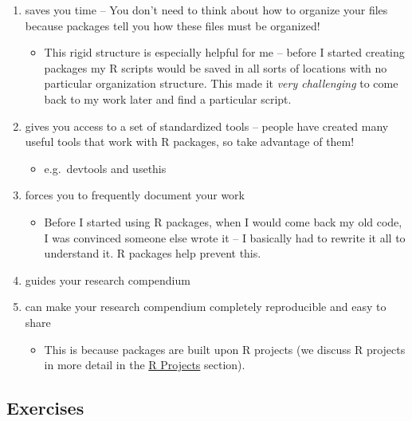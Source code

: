 \documentclass[
]{book}
\providecommand{\tightlist}{%
  \setlength{\itemsep}{0pt}\setlength{\parskip}{0pt}}
\begin{document}
\begin{enumerate}
\def\labelenumi{\arabic{enumi}.}
\item
  saves you time -- You don't need to think about how to organize your files because packages tell you how these files must be organized!

  \begin{itemize}
  \tightlist
  \item
    This rigid structure is especially helpful for me -- before I started creating packages my R scripts would be saved in all sorts of locations with no particular organization structure. This made it \emph{very challenging} to come back to my work later and find a particular script.
  \end{itemize}
\item
  gives you access to a set of standardized tools -- people have created many useful tools that work with R packages, so take advantage of them!

  \begin{itemize}
  \tightlist
  \item
    e.g.~devtools and usethis
  \end{itemize}
\item
  forces you to frequently document your work

  \begin{itemize}
  \tightlist
  \item
    Before I started using R packages, when I would come back my old code, I was convinced someone else wrote it -- I basically had to rewrite it all to understand it. R packages help prevent this.
  \end{itemize}
\item
  guides your research compendium
\item
  can make your research compendium completely reproducible and easy to share

  \begin{itemize}
  \tightlist
  \item
    This is because packages are built upon R projects (we discuss R projects in more detail in the \protect\hyperlink{r-projects}{R Projects} section).
  \end{itemize}
\end{enumerate}

\hypertarget{ex-set1}{%
\subsection{Exercises}\label{ex-set1}}
\end{document}
